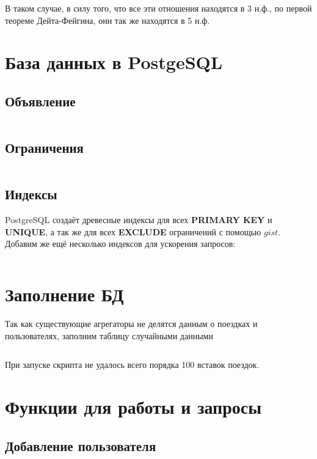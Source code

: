 \documentclass[fontsize=12pt]{article}
\begin{document}
В таком случае, в силу того, что все эти отношения находятся в 3 н.ф., по первой теореме Дейта-Фейгина, они так же находятся в 5 н.ф.

\section{База данных в PostgeSQL}

\subsection{Объявление}

\inputminted[frame=single]{sql}{scripts/create-database.sql}

\subsection{Ограничения}

\inputminted[frame=single]{sql}{scripts/add-constraints.sql}

\subsection{Индексы}

PostgreSQL создаёт древесные индексы для всех \textbf{PRIMARY KEY} и \textbf{UNIQUE}, а так же для всех \textbf{EXCLUDE} ограничений с помощью $gist$. Добавим же ещё несколько индексов для ускорения запросов:

\inputminted[frame=single]{sql}{scripts/add-indexes.sql}

\section{Заполнение БД}

Так как существующие агрегаторы не делятся данным о поездках и пользователях, заполним таблицу случайными данными

\inputminted[frame=single, fontsize=\small]{python}{scripts/fill-database.py}
	
При запуске скрипта не удалось всего порядка 100 вставок поездок.	

\section{Функции для работы и запросы}

\subsection*{Добавление пользователя}
\end{document}
